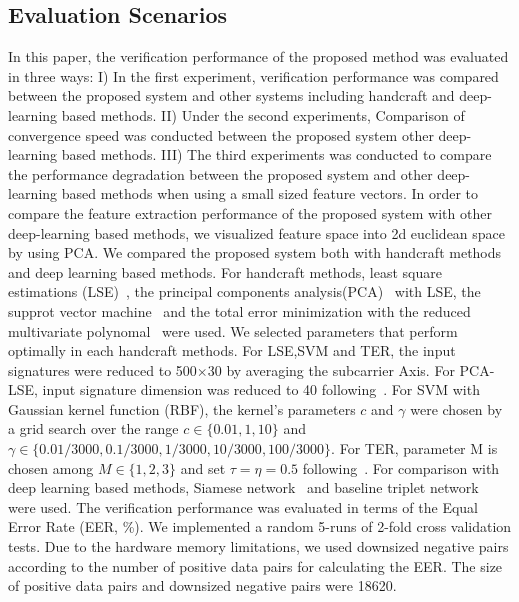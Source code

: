 \subsection{Evaluation Scenarios}
In this paper, the verification performance of the proposed method was evaluated in three ways:
I) In the first experiment, verification performance was compared between the proposed system and other systems including handcraft and deep-learning based methods.
II) Under the second experiments, Comparison of convergence speed was conducted between the proposed system other deep-learning based methods. 
III) The third experiments was conducted to compare the performance degradation between the proposed system and other deep-learning based methods when using a small sized feature vectors. 
In order to compare the feature extraction performance of the proposed system with other deep-learning based methods, we visualized feature space into 2d euclidean space by using PCA. 
We compared the proposed system both with handcraft methods and deep learning based methods.
For handcraft methods, least square estimations (LSE)~\cite{duda2012pattern}, the principal components analysis(PCA)~\cite{turk1991eigenfaces} with LSE, the supprot vector machine~\cite{vapnik2013nature} and the total error minimization with the reduced multivariate polynomal~\cite{toh2003fingerprint,toh2008between} were used. We selected parameters that perform optimally in each handcraft methods. For LSE,SVM and TER, the input signatures were reduced to 500$\times$30 by averaging the subcarrier Axis. For PCA-LSE, input signature dimension was reduced to 40 following~\cite{moon2017air}. For SVM with Gaussian kernel function (RBF), the kernel's parameters $c$ and $\gamma$ were chosen by a grid search over the range $c\in\{0.01,1,10\}$ and $\gamma\in\{0.01/3000, 0.1/3000, 1/3000, 10/3000, 100/3000\}$. For TER, parameter M is chosen among $M\in\{1,2,3\}$ and set $\tau=\eta=0.5$ following~\cite{toh2008between}.
For comparison with deep learning based methods, Siamese network~\cite{koch2015siamese} and baseline triplet network~\cite{hoffer2015deep} were used.
The verification performance was evaluated in terms of the Equal Error Rate (EER, \%). We implemented a random 5-runs of 2-fold cross validation tests.
Due to the hardware memory limitations, we used downsized negative pairs according to the number of positive data pairs for calculating the EER. The size of positive data pairs and downsized negative pairs were 18620.

